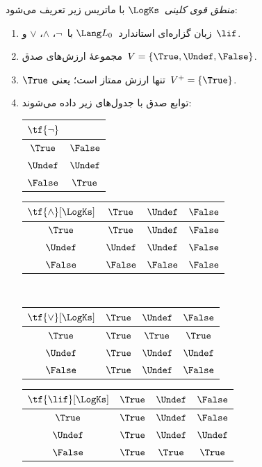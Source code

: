 \documentclass[../../../include/open-logic-section]{subfiles}
\begin{document}
\begin{defn}
\emph{منطق قوی کلینی}~$\LogKs$ با ماتریس زیر تعریف می‌شود:
\begin{enumerate}
  \item زبان گزاره‌ای استاندارد~$\Lang L_0$ با~$\lnot$، $\land$،
  $\lor$ و~$\lif$.
  \item مجموعهٔ ارزش‌های صدق~$V = \{\True, \Undef, \False\}$.
  \item $\True$ تنها ارزش ممتاز است؛ یعنی~$V^+ = \{\True\}$.
  \item توابع صدق با جدول‌های زیر داده می‌شوند:
  \begin{center}
    \begin{tabular}{c|c} 
      $\tf{\lnot}$ & \\ 
      \hline  
      $\True$ & $\False$ \\ 
      $\Undef$ & $\Undef$ \\
      $\False$ & $\True$ 
    \end{tabular}
    \quad
    \begin{tabular}{c|ccc} 
      $\tf{\land}[\LogKs]$ & $\True$ & $\Undef$ & $\False$ \\ 
      \hline 
      $\True$ & $\True$ & $\Undef$ & $\False$ \\ 
      $\Undef$ & $\Undef$ & $\Undef$ & $\False$\\ 
      $\False$ & $\False$ & $\False$ & $\False$ 
    \end{tabular}
    \\[2ex]
    \begin{tabular}{c|ccc} 
      $\tf{\lor}[\LogKs]$ & $\True$ & $\Undef$ & $\False$ \\ 
      \hline 
      $\True$ & $\True$ & $\True$ & $\True$ \\ 
      $\Undef$ & $\True$ & $\Undef$ & $\Undef$ \\
      $\False$ & $\True$ & $\Undef$ & $\False$ 
    \end{tabular}
    \quad
    \begin{tabular}{c|ccc} 
      $\tf{\lif}[\LogKs]$ & $\True$ & $\Undef$ & $\False$ \\ 
      \hline 
      $\True$ & $\True$ & $\Undef$ & $\False$ \\ 
      $\Undef$ & $\True$ & $\Undef$ & $\Undef$  \\ 
      $\False$ & $\True$ & $\True$ & $\True$ 
    \end{tabular}
  \end{center} 
\end{enumerate}
\end{defn}
\end{document}
